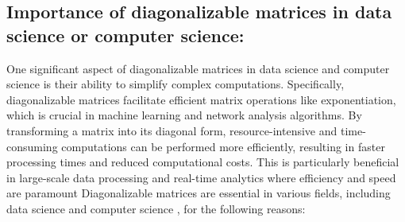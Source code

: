 \documentclass{article}
\begin{document}
\subsection*{Importance of diagonalizable matrices in data science or computer science:}
One significant aspect of diagonalizable matrices in data science and computer science is their ability to simplify complex computations. Specifically, diagonalizable matrices facilitate efficient matrix operations like exponentiation, which is crucial in machine learning and network analysis algorithms. By transforming a matrix into its diagonal form, resource-intensive and time-consuming computations can be performed more efficiently, resulting in faster processing times and reduced computational costs. This is particularly beneficial in large-scale data processing and real-time analytics where efficiency and speed are paramount
Diagonalizable matrices are essential in various fields, including data science and computer science , for the following reasons:
\end{document}
